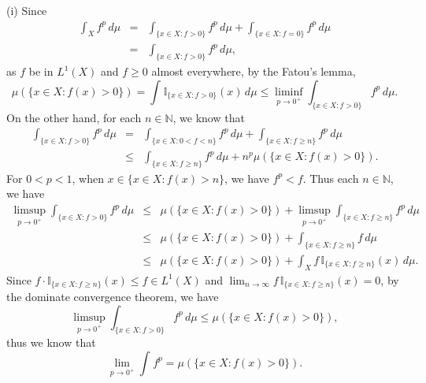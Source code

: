 \documentclass[12pt,a4paper]{ctexart}
\begin{document}
(i) Since
\begin{eqnarray*}
    \int_{X}^{} f^{p} \, d \mu & = & \int_{\{x \in X: f > 0\}}^{} f^{p} \, d \mu + \int_{\{x \in X: f = 0\}}^{} f^{p} \, d \mu \\
    & = & \int_{\{x \in X: f > 0\}}^{} f^{p} \, d \mu,
\end{eqnarray*}
as $f$ be in $L^{1}(X)$ and $f \geq 0$ almost everywhere, by the Fatou's lemma,
\begin{equation*}
    \mu(\{x \in X:  f(x) > 0\}) = \int_{}^{} \mathbb{I}_{\{x \in X: f > 0\}} (x) \, d \mu \leq \liminf_{p \to 0^{+}} \int_{\{x \in X: f > 0\}}^{} f^{p} \, d \mu.
\end{equation*}
On the other hand, for each $n \in \mathbb N$, we know that
\begin{eqnarray*}
    \int_{\{x \in X: f > 0\}}^{} f^{p} \, d \mu & = & \int_{\{x \in X: 0 < f < n\}}^{} f^{p} \, d \mu  + \int_{\{x \in X: f \geq n\}}^{} f^{p} \, d \mu \\
    & \leq & \int_{\{x \in X: f \geq n\}}^{} f^{p} \, d \mu + n^{p} \mu(\{x \in X:  f(x) > 0\}).
\end{eqnarray*}
For $0 < p < 1$, when $x \in \{x \in X:  f(x) > n\}$, we have $f^{p} < f$. Thus each $n \in \mathbb N$, we have
\begin{eqnarray*}
    \limsup_{p \to 0^{+}} \int_{\{x \in X: f > 0\}}^{} f^{p} \, d \mu & \leq &  \mu(\{x \in X:  f(x) > 0\}) + \limsup_{p \to 0^{+}} \int_{\{x \in X: f \geq n\}}^{} f^{p} \, d \mu \\
    & \leq & \mu(\{x \in X:  f(x) > 0\}) + \int_{\{x \in X: f \geq n\}}^{} f \, d \mu \\
    & \leq & \mu(\{x \in X:  f(x) > 0\}) + \int_{X}^{} f \, \mathbb{I}_{\{x \in X: f \geq n\}}(x) \, d \mu.
\end{eqnarray*}
Since $f \cdot \mathbb{I}_{\{x \in X: f \geq n\}}(x) \leq f \in L^{1}(X)$ and $\lim_{n \to \infty} f \, \mathbb{I}_{\{x \in X: f \geq n\}}(x) = 0 $, by the dominate convergence theorem, we have
\begin{equation*}
    \limsup_{p \to 0^{+}} \int_{\{x \in X: f > 0\}}^{} f^{p} \, d \mu \leq \mu(\{x \in X:  f(x) > 0\}),
\end{equation*}
thus we know that
\begin{equation*}
    \lim_{p \to 0^{+}} \int_{}^{} f^{p} = \mu(\{x \in X:  f(x) > 0\}).
\end{equation*}
\end{document}
